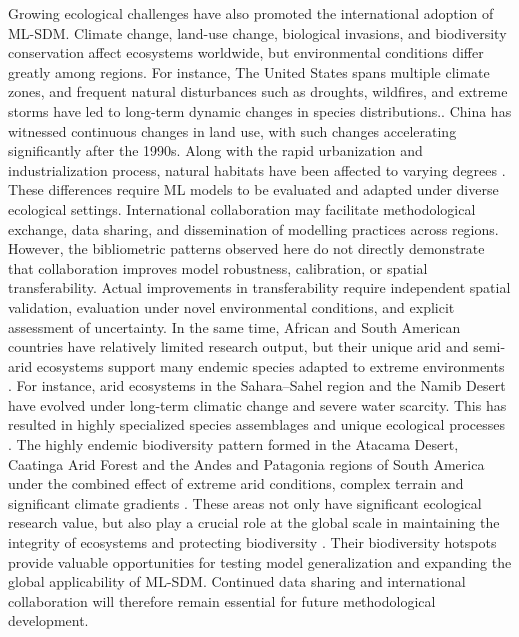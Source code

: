 \documentclass[authoryear,preprint,review,12pt]{elsarticle}
\begin{document}
Growing ecological challenges have also promoted the international adoption of ML-SDM. Climate change, land-use change, biological invasions, and biodiversity conservation affect ecosystems worldwide, but environmental conditions differ greatly among regions. For instance, The United States spans multiple climate zones, and frequent natural disturbances such as droughts, wildfires, and extreme storms have led to long-term dynamic changes in species distributions.\citep{turner2010disturbance}. China has witnessed continuous changes in land use, with such changes accelerating significantly after the 1990s. Along with the rapid urbanization and industrialization process, natural habitats have been affected to varying degrees \citep{liu1999framework,liu2010spatial}. These differences require ML models to be evaluated and adapted under diverse ecological settings. International collaboration may facilitate methodological exchange, data sharing, and dissemination of modelling practices across regions. However, the bibliometric patterns observed here do not directly demonstrate that collaboration improves model robustness, calibration, or spatial transferability. Actual improvements in transferability require independent spatial validation, evaluation under novel environmental conditions, and explicit assessment of uncertainty. In the same time, African and South American countries have relatively limited research output, but their unique arid and semi-arid ecosystems support many endemic species adapted to extreme environments  \citep{myers2000biodiversity}. For instance, arid ecosystems in the Sahara–Sahel region and the Namib Desert have evolved under long-term climatic change and severe water scarcity. This has resulted in highly specialized species assemblages and unique ecological processes \citep{le1997climate,henschel2008ecophysiology}. The highly endemic biodiversity pattern formed in the Atacama Desert, Caatinga Arid Forest and the Andes and Patagonia regions of South America under the combined effect of extreme arid conditions, complex terrain and significant climate gradients \citep{azua2012life,leal2005changing}. These areas not only have significant ecological research value, but also play a crucial role at the global scale in maintaining the integrity of ecosystems and protecting biodiversity \citep{myers2000biodiversity,ceballos2015accelerated}. Their biodiversity hotspots provide valuable opportunities for testing model generalization and expanding the global applicability of ML-SDM. Continued data sharing and international collaboration will therefore remain essential for future methodological development.
\end{document}
